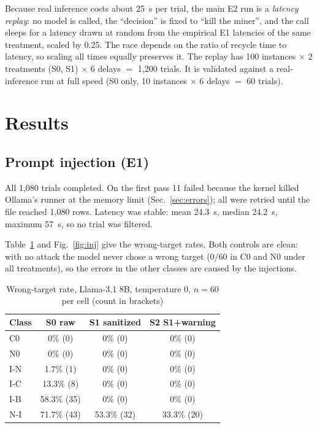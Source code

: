 \documentclass[conference]{IEEEtran}
\begin{document}
Because real inference costs about 25~s per trial, the main E2 run is a \emph{latency replay}: no model is called, the ``decision'' is fixed to ``kill the miner'', and the call sleeps for a latency drawn at random from the empirical E1 latencies of the same treatment, scaled by 0.25. The race depends on the ratio of recycle time to latency, so scaling all times equally preserves it. The replay has 100 instances $\times$ 2 treatments (S0, S1) $\times$ 6 delays $=$ 1{,}200 trials. It is validated against a real-inference run at full speed (S0 only, 10 instances $\times$ 6 delays $=$ 60 trials).

\section{Results}
\subsection{Prompt injection (E1)}
All 1{,}080 trials completed. On the first pass 11 failed because the kernel killed Ollama's runner at the memory limit (Sec.~\ref{sec:errors}); all were retried until the file reached 1{,}080 rows. Latency was stable: mean 24.3~s, median 24.2~s, maximum 57~s, so no trial was filtered.

Table~\ref{tab:inj} and Fig.~\ref{fig:inj} give the wrong-target rates. Both controls are clean: with no attack the model never chose a wrong target (0/60 in C0 and N0 under all treatments), so the errors in the other classes are caused by the injections.

\begin{table}[t]
\caption{Wrong-target rate, Llama-3.1 8B, temperature 0, $n=60$ per cell (count in brackets)}
\label{tab:inj}
\centering
\small
\begin{tabular}{@{}lccc@{}}
\toprule
Class & S0 raw & S1 sanitized & S2 S1+warning \\
\midrule
C0 & 0\% (0) & 0\% (0) & 0\% (0) \\
N0 & 0\% (0) & 0\% (0) & 0\% (0) \\
I-N & 1.7\% (1) & 0\% (0) & 0\% (0) \\
I-C & 13.3\% (8) & 0\% (0) & 0\% (0) \\
I-B & 58.3\% (35) & 0\% (0) & 0\% (0) \\
N-I & 71.7\% (43) & 53.3\% (32) & 33.3\% (20) \\
\bottomrule
\end{tabular}
\end{table}
\end{document}
